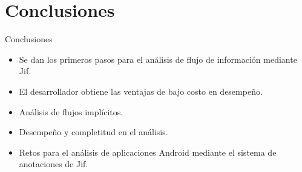  \section{Conclusiones}
	
\begin{frame}{Conclusiones}
\begin{block}{}
	\begin{itemize}
		\item Se dan los primeros pasos para el análisis de flujo de
		información mediante Jif.\pause
		\item El desarrollador obtiene las ventajas de bajo costo en desempeño.
		\item Análisis de flujos implícitos.\pause
		\item Desempeño y completitud en el análisis.\pause
		\item Retos para el análisis de aplicaciones Android mediante el sistema de
		anotaciones de Jif.
	\end{itemize}
\end{block}
\end{frame}
